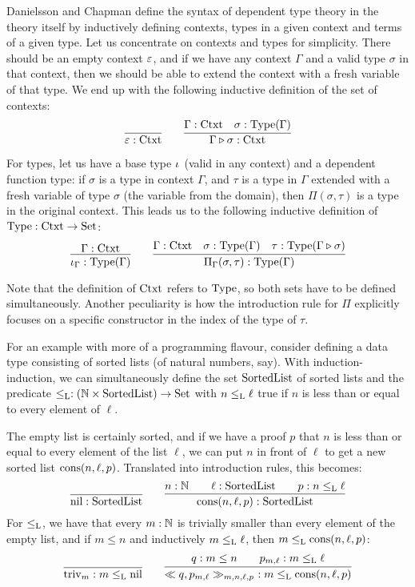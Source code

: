 \documentclass[orivec,envcountsame, ,envcountsect]{llncs}
\begin{document}
Danielsson \cite{danielsson2007formalisation} and Chapman
\cite{chapman2009eatitself} define the syntax of dependent type theory
in the theory itself by inductively defining contexts, types in a
given context and terms of a given type. Let us concentrate on
contexts and types for simplicity. There should be an empty
context $\varepsilon$, and if we have any context $\Gamma$ and a valid
type $\sigma$ in that context, then we should be able to extend the
context with a fresh variable of that type. We end up with the
following inductive definition of the set of contexts:
\[
\infer{\emptyCtxt : \Ctxt}{} \qquad
\infer{\consCtxt{\Gamma}{\sigma} : \Ctxt}{\Gamma : \Ctxt & \sigma : \Type(\Gamma)}
\]

For types, let us have a base type $\iota_{}$ (valid in any context)
and a dependent function type: if $\sigma$ is a type in context $\Gamma$,
and $\tau$ is a type in $\Gamma$ extended with a fresh variable of type
$\sigma$ (the variable from the domain), then $\Pi(\sigma, \tau)$ is a
type in the original context. This leads us to the following inductive
definition of $\text{Type} : \text{Ctxt} \to \text{Set}$:
\[
\infer{\baseTy{\Gamma} : \Type(\Gamma)}{\Gamma : \Ctxt} \qquad
\infer{\piTy{\Gamma}{\sigma}{\tau} : \Type(\Gamma)}{\Gamma : \Ctxt
                    & \sigma : \Type(\Gamma)
                    & \tau : \Type(\consCtxt{\Gamma}{\sigma})}
\]

Note that the definition of $\text{Ctxt}$ refers to $\text{Type}$, so both sets
have to be defined simultaneously. Another peculiarity is how the
introduction rule for $\Pi$ explicitly focuses on a specific
constructor in the index of the type of $\tau$.

For an example with more of a programming flavour, consider defining a
data type consisting of sorted lists (of natural numbers, say). With
induction-induction, we can simultaneously define the set
$\text{SortedList}$ of sorted lists and the predicate $\leq_{\text{L}} : (\mathbb{N}
\times \text{SortedList}) \to \text{Set}$ with $n \leq_{\text{L}} \ell$ true if $n$ is
less than or equal to every element of $\ell$.

The empty list is certainly sorted, and if we have a proof $p$ that
$n$ is less than or equal to every element of the list $\ell$, we can
put $n$ in front of $\ell$ to get a new sorted list
$\text{cons}(n, \ell, p)$. Translated into introduction rules, this becomes:
\[
\infer{\nilList : \SortedList}{} \qquad
\infer{\consList{n}{\ell}{p} : \SortedList}{n : \Nat \quad & \ell : \SortedList \quad & p : n \lessList \ell}
\]
For $\leq_{\text{L}}$, we have that every $m : \mathbb{N}$ is trivially smaller
than every element of the empty list, and if $m \leq n$ and
inductively $m \leq_{\text{L}} \ell$, then $m \leq_{\text{L}} \text{cons}(n, \ell, p)$:
\[
\infer{\nilLess{m} : m \lessList \nilList}
{} \qquad
\infer{\consLess{n}{\ell}{p}{m}{q}{p_{m, \ell}}\ : m \lessList \consList{n}{\ell}{p}}
       {q : m \leq n \quad & p_{m, \ell} : m \lessList \ell}
\]
\end{document}
